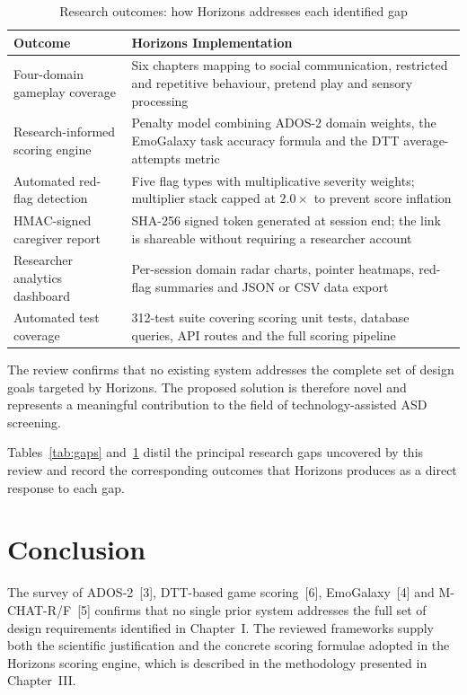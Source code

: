\documentclass[12pt,a4paper,oneside]{report}
\begin{document}
	\begin{table}[b]
		\caption{Research outcomes: how Horizons addresses each identified gap}
		\label{tab:outcomes}
		\begin{tabularx}{\linewidth}{p{4.6cm}X}
			\toprule
			\textbf{Outcome} & \textbf{Horizons Implementation} \\
			\midrule
			Four-domain gameplay coverage
			& Six chapters mapping to social communication, restricted and repetitive behaviour, pretend play and sensory processing \\
			Research-informed scoring engine
			& Penalty model combining ADOS-2 domain weights, the EmoGalaxy task accuracy formula and the DTT average-attempts metric \\
			Automated red-flag detection
			& Five flag types with multiplicative severity weights; multiplier stack capped at $2.0\times$ to prevent score inflation \\
			HMAC-signed caregiver report
			& SHA-256 signed token generated at session end; the link is shareable without requiring a researcher account \\
			Researcher analytics dashboard
			& Per-session domain radar charts, pointer heatmaps, red-flag summaries and JSON or CSV data export \\
			Automated test coverage
			& 312-test suite covering scoring unit tests, database queries, API routes and the full scoring pipeline \\
			\bottomrule
		\end{tabularx}
	\end{table}
	
	
	The review confirms that no existing system addresses the complete set of design goals targeted by Horizons. The proposed solution is therefore novel and represents a meaningful contribution to the field of technology-assisted ASD screening.
	
	Tables~\ref{tab:gaps} and~\ref{tab:outcomes} distil the principal research gaps uncovered by this review and record the corresponding outcomes that Horizons produces as a direct response to each gap.
	
	\clearpage
	
	\section{Conclusion}
	
	The survey of ADOS-2~[3], DTT-based game scoring~[6], EmoGalaxy~[4] and M-CHAT-R/F~[5] confirms that no single prior system addresses the full set of design requirements identified in Chapter~I. The reviewed frameworks supply both the scientific justification and the concrete scoring formulae adopted in the Horizons scoring engine, which is described in the methodology presented in Chapter~III.
	
\end{document}
